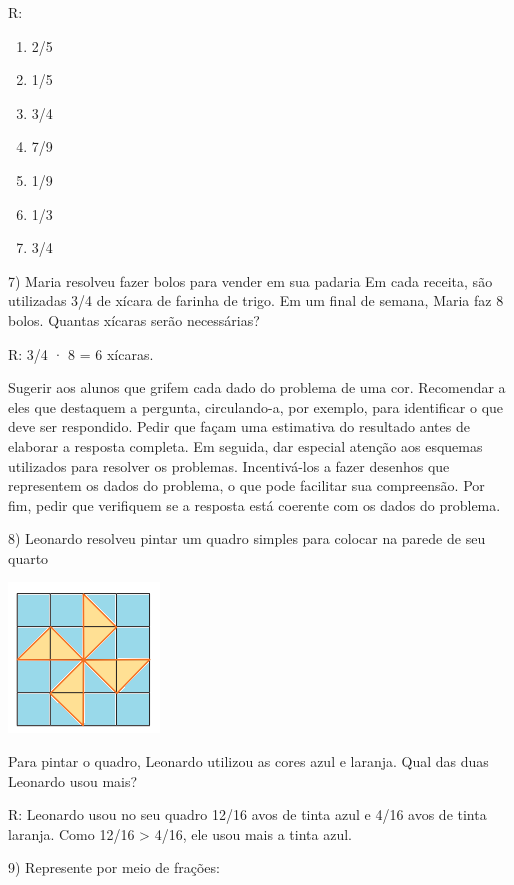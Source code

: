 R:

\begin{enumerate}
\def\labelenumi{\alph{enumi})}
\item
  2/5
\item
  1/5
\item
  3/4
\item
  7/9
\item
  1/9
\item
  1/3
\item
  3/4
\end{enumerate}

7) Maria resolveu fazer bolos para vender em sua padaria Em cada
receita, são utilizadas 3/4 de xícara de farinha de trigo. Em um final
de semana, Maria faz 8 bolos. Quantas xícaras serão necessárias?

R: 3/4 · 8 = 6 xícaras.

Sugerir aos alunos que grifem cada dado do problema de uma cor.
Recomendar a eles que destaquem a pergunta, circulando-a, por exemplo,
para identificar o que deve ser respondido. Pedir que façam uma
estimativa do resultado antes de elaborar a resposta completa. Em
seguida, dar especial atenção aos esquemas utilizados para resolver os
problemas. Incentivá-los a fazer desenhos que representem os dados do
problema, o que pode facilitar sua compreensão. Por fim, pedir que
verifiquem se a resposta está coerente com os dados do problema.

8) Leonardo resolveu pintar um quadro simples para colocar na parede de
seu quarto

\includegraphics[width=1.58333in,height=1.57292in]{./imgSAEB_6_MAT/media/image33.png}

Para pintar o quadro, Leonardo utilizou as cores azul e laranja. Qual
das duas Leonardo usou mais?

R: Leonardo usou no seu quadro 12/16 avos de tinta azul e 4/16 avos de
tinta laranja. Como 12/16 \textgreater{} 4/16, ele usou mais a tinta
azul.

9) Represente por meio de frações:

